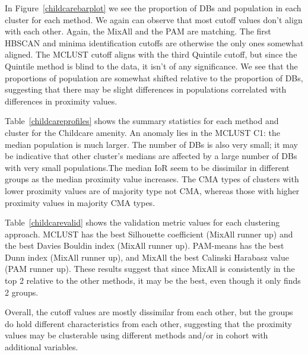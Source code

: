 \documentclass[11pt, a4paper]{article}
\begin{document}
In Figure~\ref{childcarebarplot} we see the proportion of DBs and population in each cluster for each method. We again can observe that most cutoff values don't align with each other. Again, the MixAll and the PAM are matching. The first HBSCAN and minima identification cutoffs are otherwise the only ones somewhat aligned. The MCLUST cutoff aligns with the third Quintile cutoff, but since the Quintile method is blind to the data, it isn't of any significance. We see that the proportions of population are somewhat shifted relative to the proportion of DBs, suggesting that there may be slight differences in populations correlated with differences in proximity values.
\par
Table~\ref{childcareprofiles} shows the summary statistics for each method and cluster for the Childcare amenity. An anomaly lies in the MCLUST C1: the median population is much larger. The number of DBs is also very small; it may be indicative that other cluster's medians are affected by a large number of DBs with very small populations.The median IoR seem to be dissimilar in different groups as the median proximity value increases. The CMA types of clusters with lower proximity values are of majority type not CMA, whereas those with higher proximity values in majority CMA types.
\par
Table~\ref{childcarevalid} shows the validation metric values for each clustering approach. MCLUST has the best Silhouette coefficient (MixAll runner up) and the best Davies Bouldin index (MixAll runner up). PAM-means has the best Dunn index (MixAll runner up), and MixAll the best Calinski Harabasz value (PAM runner up). These results suggest that since MixAll is consistently in the top 2 relative to the other methods, it may be the best, even though it only finds 2 groups.
\par
Overall, the cutoff values are mostly dissimilar from each other, but the groups do hold different characteristics from each other, suggesting that the proximity values may be clusterable using different methods and/or in cohort with additional variables.
\end{document}
